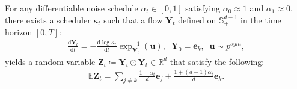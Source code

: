\begin{tcolorbox}
[colback=white,colframe=blue!30!white]
\begin{proposition}
\label{prop:uniform_flow}
For any differentiable noise schedule $\alpha_t\!\in\![0,1]$ satisfying $\alpha_0\!\approx\!1$ and $\alpha_1\!\approx\!0$, there exists a scheduler $\kappa_t$ such that a flow $\bm{Y}_t$ defined on $\mathbb{S}^{d-1}_{+}$ in the time horizon $[0,T]$:
\begin{align}
    \frac{\mathrm{d}\bm{Y}_t}{\mathrm{d}t} 
    = -\frac{\mathrm{d}\log\kappa_t}{\mathrm{d}t} \exp^{-1}_{\bm{Y}_t}(\bm{u}),  \;\; \bm{Y}_0=\bm{e}_k, \;\; \bm{u}\sim p^{sym},
\label{eq:uniform_flow}
\end{align}
yields a random variable $\bm{Z}_t\coloneqq\bm{Y}_t\odot\bm{Y}_t\in\mathbb{R}^{d}$ that satisfy the following:
\begin{align}
    \mathbb{E}\bm{Z}_t = \sum_{j\neq k}\frac{1-\alpha_t}{d}\bm{e}_j + \frac{1 + (d-1)\alpha_t}{d}\bm{e}_k .
\label{eq:uniform_simplex}
\end{align}
\end{proposition}
\end{tcolorbox}

